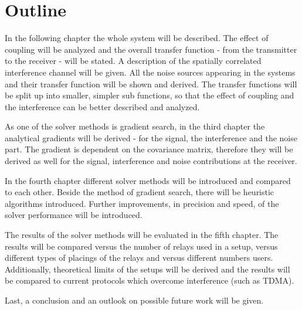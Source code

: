 \section{Outline}
\label{sec:outline}

In the following chapter the whole system will be described.
The effect of coupling will be analyzed and the overall transfer function - from the transmitter to the receiver - will be stated.
A description of the spatially correlated interference channel will be given.
All the noise sources appearing in the systems and their transfer function will be shown and derived.
The transfer functions will be split up into smaller, simpler sub functions, so that the effect of coupling and the interference can be better described and analyzed.

As one of the solver methods is gradient search, in the third chapter the analytical gradients will be derived - for the signal, the interference and the noise part.
The gradient is dependent on the covariance matrix, therefore they will be derived as well for the signal, interference and noise contributions at the receiver.

In the fourth chapter different solver methods will be introduced and compared to each other.
Beside the method of gradient search, there will be heuristic algorithms introduced.
Further improvements, in precision and speed, of the solver performance will be introduced.

The results of the solver methods will be evaluated in the fifth chapter.
The results will be compared versus the number of relays used in a setup,
versus different types of placings of the relays and versus different numbers users.
Additionally, theoretical limits of the setups will be derived and the results will be compared to current protocols which overcome interference (such as TDMA).

Last, a conclusion and an outlook on possible future work will be given.







